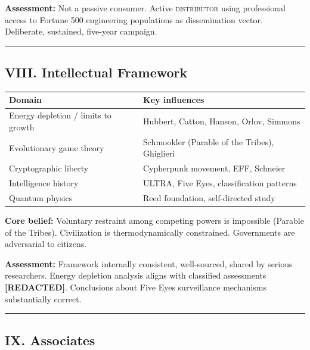 \textbf{Assessment:} Not a passive consumer. Active \textsc{distributor} using professional access to Fortune 500 engineering populations as dissemination vector. Deliberate, sustained, five-year campaign.

\vspace{1cm}\hrule\vspace{1cm}

\subsection*{VIII. Intellectual Framework}
\label{record:tgt-intellectual-framework}

{%
\small
\begin{tabular}{p{4.5cm} p{9cm}}
\hline
\textbf{Domain} & \textbf{Key influences} \\
\hline
Energy depletion / limits to growth & Hubbert, Catton, Hanson, Orlov, Simmons \\
Evolutionary game theory & Schmookler (Parable of the Tribes), Ghiglieri \\
Cryptographic liberty & Cypherpunk movement, EFF, Schneier \\
Intelligence history & ULTRA, Five Eyes, classification patterns \\
Quantum physics & Reed foundation, self-directed study \\
\hline
\end{tabular}
}%

\medskip

\textbf{Core belief:} Voluntary restraint among competing powers is impossible (Parable of the Tribes). Civilization is thermodynamically constrained. Governments are adversarial to citizens.

\textbf{Assessment:} Framework internally consistent, well-sourced, shared by serious researchers. Energy depletion analysis aligns with classified assessments \textbf{[REDACTED]}. Conclusions about Five Eyes surveillance mechanisms substantially correct.

\vspace{1cm}\hrule\vspace{1cm}

\subsection*{IX. Associates}
\label{record:tgt-associates}

